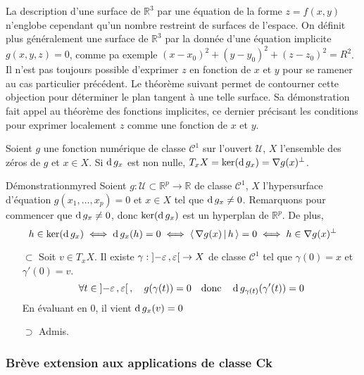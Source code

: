     La description d’une surface de $\mathbb{R}^3$ par une équation de la forme $z = f(x,y)$ n’englobe cependant qu’un nombre restreint de surfaces de l’espace. On définit plus généralement une surface de $\mathbb{R}^3$ par la donnée d’une équation implicite $g(x,y,z) = 0$, comme pa exemple $(x - x_0)^2 + (y - y_0)^2 + (z - z_0)^2 = R^2$. Il n’est pas toujours possible d’exprimer $z$ en fonction de $x$ et $y$ pour se ramener au cas particulier précédent. Le théorème suivant permet de contourner cette objection pour déterminer le plan tangent à une telle surface. Sa démonstration fait appel au théorème des fonctions implicites, ce dernier précisant les conditions pour exprimer localement $z$ comme une fonction de $x$ et $y$.

    \begin{theo}{}{}
        Soient $g$ une fonction numérique de classe $\mathcal{C}^1$ sur l’ouvert $\mathcal{U}$, $X$ l’ensemble des zéros de $g$ et $x \in X$. Si $\operatorname{d} g_x$ est non nulle, $T_x X = \ker(\operatorname{d} g_x) = \nabla g(x)^{\perp}$.
    \end{theo}

    \begin{demo}{Démonstration}{myred}
        Soient $g : \mathcal{U} \subset \mathbb{R}^p \to \mathbb{R}$ de classe $\mathcal{C}^1$, $X$ l’hypersurface d’équation $g(x_1,\ldots,x_p) = 0$ et $x \in X$ tel que $\operatorname{d} g_x \neq 0$. Remarquons pour commencer que $\operatorname{d} g_{x} \neq 0$, donc $\ker(\operatorname{d} g_x)$ est un hyperplan de $\mathbb{R}^p$. De plus, 
        \[ h \in \ker(\operatorname{d} g_x) \iff \operatorname{d} g_x(h) = 0 \iff \left<\,\nabla g(x)\,\middle|\,h\,\right> = 0 \iff h \in \nabla g(x)^{\perp} \] 
        \begin{itemize}
            \item[$\subset$] Soit $v \in T_x X$. Il existe $\gamma : \left] -\varepsilon \, , \varepsilon \right[ \to X$ de classe $\mathcal{C}^1$ tel que $\gamma(0) = x$ et $\gamma'(0) = v$.
            \[ \forall t \in \left] -\varepsilon \, , \varepsilon \right[, \quad g(\gamma(t)) = 0 \quad \text{donc} \quad \operatorname{d} g_{\gamma(t)}(\gamma'(t)) = 0 \]   
            En évaluant en $0$, il vient $\operatorname{d} g_x(v) = 0$ 
            \item[$\supset$] Admis.
        \end{itemize}
    \end{demo}



    \subsubsection{Brève extension aux applications de classe Ck}

